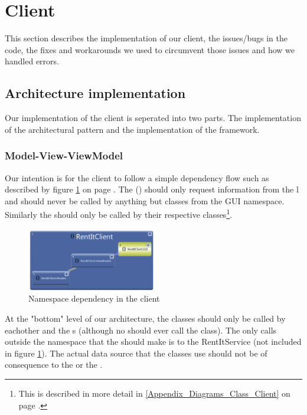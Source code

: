 \section{Client}
\label{Implementation_Client}
This section describes the implementation of our client, the issues/bugs in the code, the fixes and workarounds we used to circumvent those issues and how we handled errors.
\subsection{Architecture implementation}
\label{Implementation_Client_Architecture}
Our implementation of the client is seperated into two parts. The implementation of the  architectural pattern and the implementation of the  framework.
\subsubsection{Model-View-ViewModel}
\label{Implementation_Client_Architecture_MVVM}
Our intention is for the client to follow a simple dependency flow such as described by figure \ref{fig:Implementation_Client_Architecture_MVVM_Namespace} on page \pageref{fig:Implementation_Client_Architecture_MVVM_Namespace}. The  () should only request information from the l and should never be called by anything but classes from the GUI namespace. Similarly the  should only be called by their respective  classes\footnote{This is described in more detail in \ref{Appendix_Diagrams_Class_Client} on page \pageref{Appendix_Diagrams_Class_Client}.}. 
\begin{figure}[h!]
  \centering
    \includegraphics[width=0.5\textwidth]{Parts/Images/Implementation/NamespaceDependency}
  \caption{Namespace dependency in the client}
\label{fig:Implementation_Client_Architecture_MVVM_Namespace}
\end{figure}

At the "bottom" level of our architecture, the  classes should only be called by eachother and the s (although no  should ever call the  class). The only calls outside the namespace that the  should make is to the RentItService (not included in figure \ref{fig:Implementation_Client_Architecture_MVVM_Namespace}). The actual data source that the  classes use should not be of consequence to the  or the . 

